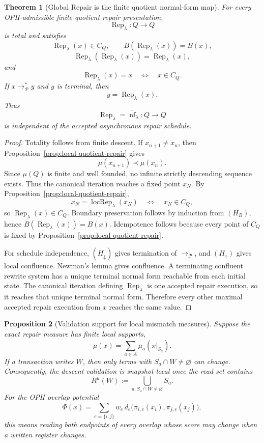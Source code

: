 \documentclass[11pt]{article}
\newtheorem{theorem}{Theorem}[section]
\newtheorem{proposition}[theorem]{Proposition}
\theoremstyle{remark}
\theoremstyle{plain}
\begin{document}
\begin{theorem}[Global Repair is the finite quotient normal-form map]\label{thm:quotient-repair-normal-form}
For every OPH-admissible finite quotient repair presentation,
\[
\operatorname{Rep}_\lambda:Q\to Q
\]
is total and satisfies
\[
\operatorname{Rep}_\lambda(x)\in C_Q,\qquad
B(\operatorname{Rep}_\lambda(x))=B(x),
\]
\[
\operatorname{Rep}_\lambda(\operatorname{Rep}_\lambda(x))
=
\operatorname{Rep}_\lambda(x),
\]
and
\[
\operatorname{Rep}_\lambda(x)=x
\quad\Longleftrightarrow\quad
x\in C_Q.
\]
If \(x\to_{\mathcal P}^{\!*}y\) and \(y\) is terminal, then
\[
y=\operatorname{Rep}_\lambda(x).
\]
Thus
\[
\operatorname{Rep}_\lambda=\overline{\operatorname{nf}}_\lambda:Q\to Q
\]
is independent of the accepted asynchronous repair schedule.
\end{theorem}

\begin{proof}
Totality follows from finite descent.  If \(x_{n+1}\ne x_n\), then
Proposition~\ref{prop:local-quotient-repair} gives
\[
\mu(x_{n+1})\prec\mu(x_n).
\]
Since \(\mu(Q)\) is finite and well founded, no infinite strictly descending sequence exists.
Thus the canonical iteration reaches a fixed point \(x_N\).  By
Proposition~\ref{prop:local-quotient-repair},
\[
x_N=\operatorname{locRep}_\lambda(x_N)
\quad\Longleftrightarrow\quad
x_N\in C_Q,
\]
so \(\operatorname{Rep}_\lambda(x)\in C_Q\).  Boundary preservation follows by induction from
\((H_B)\), hence \(B(\operatorname{Rep}_\lambda(x))=B(x)\).  Idempotence follows because every
point of \(C_Q\) is fixed by Proposition~\ref{prop:local-quotient-repair}.

For schedule independence, \((H_\downarrow)\) gives termination of \(\to_{\mathcal P}\), and
\((H_\diamond)\) gives local confluence.  Newman's lemma gives confluence.  A terminating
confluent rewrite system has a unique terminal normal form reachable from each initial state.  The
canonical iteration defining \(\operatorname{Rep}_\lambda\) is one accepted repair execution, so it
reaches that unique terminal normal form.  Therefore every other maximal accepted repair execution
from \(x\) reaches the same value.
\end{proof}

\begin{proposition}[Validation support for local mismatch measures]\label{prop:validation-support}
Suppose the exact repair measure has finite local supports,
\[
\mu(x)=\sum_{a\in A}\mu_a(x|_{S_a}).
\]
If a transaction writes \(W\), then only terms with \(S_a\cap W\ne\varnothing\) can change.
Consequently, the descent validation is snapshot-local once the read set contains
\[
R^\mu(W):=\bigcup_{a:S_a\cap W\ne\varnothing}S_a .
\]
For the OPH overlap potential
\[
\Phi(x)=\sum_{e=\{i,j\}}w_e\,d_e\!\bigl(\pi_{i,e}(x_i),\pi_{j,e}(x_j)\bigr),
\]
this means reading both endpoints of every overlap whose score may change when a written register
changes.
\end{proposition}
\end{document}
